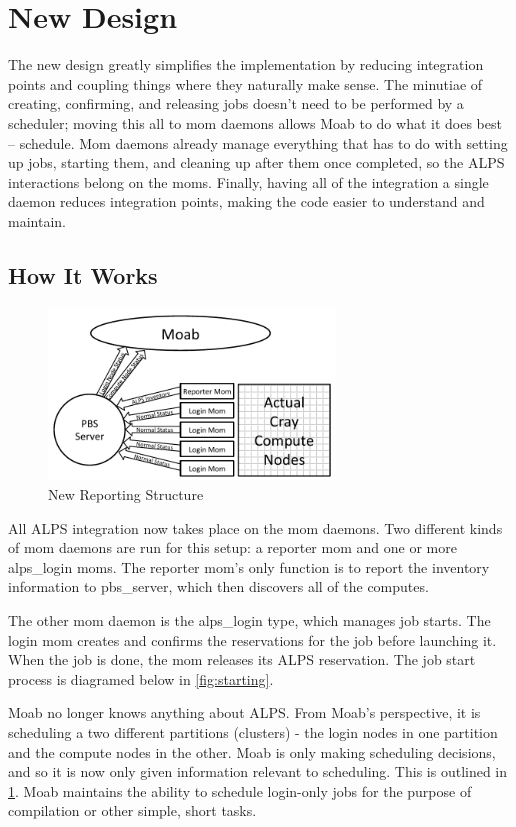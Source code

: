 \section{New Design}

The new design greatly simplifies the implementation by reducing integration
points and coupling things where they naturally make sense. The minutiae of
creating, confirming, and releasing jobs doesn't need to be performed by a
scheduler; moving this all to mom daemons allows Moab to do what it does best –
schedule. Mom daemons already manage everything that has to do with setting up
jobs, starting them, and cleaning up after them once completed, so the ALPS
interactions belong on the moms. Finally, having all of the integration a
single daemon reduces integration points, making the code easier to understand
and maintain.

\subsection{How It Works}
\begin{figure}
  \centering
  \includegraphics[width=3.0in]{figures/new-diagram.pdf}
  \caption{New Reporting Structure}\label{fig:reporting}
\end{figure}

All ALPS integration now takes place on the mom daemons. Two different kinds of
mom daemons are run for this setup: a reporter mom and one or more alps_login
moms. The reporter mom's only function is to report the inventory information
to pbs_server, which then discovers all of the computes.

The other mom daemon is the alps_login type, which manages job starts. The
login mom creates and confirms the reservations for the job before launching
it. When the job is done, the mom releases its ALPS reservation. The job start
process is diagramed below in \ref{fig:starting}.

Moab no longer knows anything about ALPS. From Moab's perspective, it is
scheduling a two different partitions (clusters) - the login nodes in one
partition and the compute nodes in the other. Moab is only making scheduling
decisions, and so it is now only given information relevant to scheduling. This
is outlined in \ref{fig:reporting}. Moab maintains the ability to schedule
login-only jobs for the purpose of compilation or other simple, short tasks.

